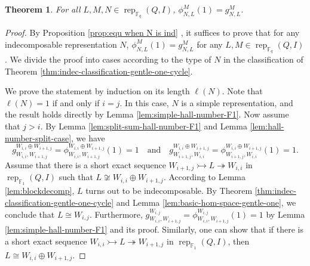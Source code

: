 \documentclass[12pt]{amsart}
\newtheorem{theorem}{Theorem}[section]
\theoremstyle{remark}
\theoremstyle{definition}
\numberwithin{equation}{section}
\begin{document}
\begin{theorem}\label{thm:hall-number-gentle-one}
For all $L,M,N\in\operatorname{rep}_{\mathbb{F}_q}(Q,I)$, $\phi_{N,L}^{M}(1)=g_{N,L}^{M}$. 
\end{theorem}
\begin{proof}
    By Proposition \ref{prop:equ when N is ind} , it suffices to prove that for any indecomposable representation
$N$, $\phi_{N,L}^{M}(1)=g_{N,L}^{M}$ for any  $L,M\in \operatorname{rep}_{\mathbb{F}_q}(Q,I)$. We divide the proof into cases according to the type of $N$ in the classification of Theorem \ref{thm:indec-classification-gentle-one-cycle}.

 We prove the statement by induction on its length $\ell(N)$.  Note that $\ell(N)=1$ if and only if $i=j$. In this case, $N$
 is a simple representation, and the result holds directly by Lemma \ref{lem:simple-hall-number-F1}. 
Now assume that $j>i$. By Lemma \ref{lem:split-sum-hall-number-F1} and Lemma \ref{lem:hall-number-split-case}, we have
\[
g_{W_{i,i},W_{i+1,j}}^{W_{i,i}\oplus W_{i+1,j}}=\phi_{W_{i,i},W_{i+1,j}}^{W_{i,i}\oplus W_{i+1,j}}(1)=1\quad \text{and}\quad g_{W_{i+1,j},W_{i,i}}^{W_{i,i}\oplus W_{i+1,j}}=\phi_{W_{i+1,j},W_{i,i}}^{W_{i,i}\oplus W_{i+1,j}}(1)=1.
\]
Assume that there is a short exact sequence $W_{i+1,j}\rightarrowtail L\twoheadrightarrow W_{i,i}$ in $\operatorname{rep}_{\mathbb{F}_1}(Q,I)$ such that $L\not\cong W_{i,i}\oplus W_{i+1,j}$. According to Lemma \ref{lem:blockdecomp}, $L$ turns out to be indecomposable. By Theorem \ref{thm:indec-classification-gentle-one-cycle} and Lemma \ref{lem:basic-hom-space-gentle-one}, we conclude that $L\cong W_{i,j}$. Furthermore, $g_{W_{i,i},W_{i+1,j}}^{W_{i,j}}=\phi_{W_{i,i},W_{i+1,j}}^{W_{i,j}}(1)=1$ by Lemma \ref{lem:simple-hall-number-F1} and its proof. Similarly, one can show that if there is a short exact sequence $W_{i,i}\rightarrowtail L\twoheadrightarrow W_{i+1,j}$ in $\operatorname{rep}_{\mathbb{F}_1}(Q,I)$, then $L\cong W_{i,i}\oplus W_{i+1,j}$.


\end{proof}
\end{document}
